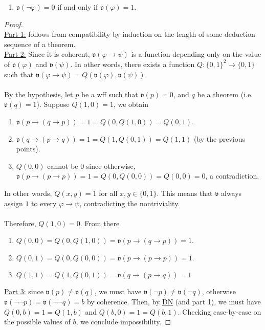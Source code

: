 \documentclass{treatise}
\begin{document}
\begin{shaded}
\begin{theorem}
\begin{enumerate}
    \item $\mathfrak{v}(\neg\varphi) = 0$ if and only if $\mathfrak{v}(\varphi) = 1$.
\end{enumerate}
\end{theorem}
\begin{proof} \ \\
\underline{Part 1:} follows from compatibility by induction on the length of some deduction sequence of a theorem.
\\
\underline{Part 2:} Since it is coherent, $\mathfrak{v}(\varphi \to \psi)$ is a function depending only on the value of $\mathfrak{v}(\varphi)$ and $\mathfrak{v}(\psi)$. In other words, there exists a function $Q: \{ 0, 1 \}^2 \to \{ 0, 1 \}$ such that $\mathfrak{v}(\varphi \to \psi) = Q(\mathfrak{v}(\varphi), \mathfrak{v}(\psi))$.
\\
\\
By the hypothesis, let $p$ be a wff such that $\mathfrak{v}(p) = 0$, and $q$ be a theorem (i.e. $\mathfrak{v}(q) = 1$). Suppose $Q(1, 0) = 1$, we obtain
\begin{enumerate}
    \item $\mathfrak{v}(p \to (q \to p)) = 1 = Q(0, Q(1, 0)) = Q(0, 1)$.
    \item $\mathfrak{v}(q \to (p \to q)) = 1 = Q(1, Q(0, 1)) = Q(1, 1)$ (by the previous points).
    \item $Q(0, 0)$ cannot be $0$ since otherwise, $\mathfrak{v}(p \to (p \to p)) = 1 = Q(0, Q(0, 0)) = Q(0, 0) = 0$, a contradiction.
\end{enumerate}
In other words, $Q(x, y) = 1$ for all $x, y \in \{ 0, 1 \}$. This means that $\mathfrak{v}$ always assign $1$ to every $\varphi \to \psi$, contradicting the nontriviality.
\\
\\
Therefore, $Q(1, 0) = 0$. From there
\begin{enumerate}
    \item $Q(0, 0) = Q(0, Q(1, 0)) = \mathfrak{v}(p \to (q \to p)) = 1$.
    \item $Q(0, 1) = Q(0, Q(0, 0)) = \mathfrak{v}(p \to (p \to p)) = 1$.
    \item $Q(1, 1) = Q(1, Q(0, 1)) = \mathfrak{v}(q \to (p \to q)) = 1$
\end{enumerate}
\underline{Part 3:} since $\mathfrak{v}(p) \neq \mathfrak{v}(q)$, we must have $\mathfrak{v}(\neg p) \neq \mathfrak{v}(\neg q)$, otherwise $\mathfrak{v}(\neg \neg p) = \mathfrak{v}(\neg \neg q) = b$ by coherence. Then, by \hyperref[HPL-T-DN]{DN} (and part 1), we must have $Q(0, b) = 1 = Q(1, b)$ and $Q(b, 0) = 1 = Q(b, 1)$. Checking case-by-case on the possible values of $b$, we conclude impossibility.

\end{proof}
\end{shaded}
\end{document}

